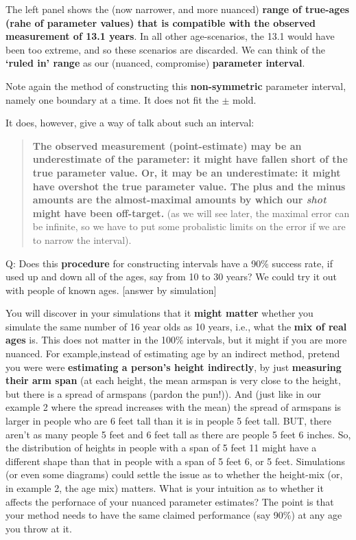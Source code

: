 \documentclass[
]{article}
\begin{document}
The left panel shows the (now narrower, and more nuanced) \textbf{range
of true-ages (rahe of parameter values) that is compatible with the
observed measurement of 13.1 years}. In all other age-scenarios, the
13.1 would have been too extreme, and so these scenarios are discarded.
We can think of the \textbf{`ruled in' range} as our (nuanced,
compromise) \textbf{parameter interval}.

Note again the method of constructing this \textbf{non-symmetric}
parameter interval, namely one boundary at a time. It does not fit the
\(\pm\) mold.

It does, however, give a way of talk about such an interval:

\begin{quote}
\textbf{The observed measurement (point-estimate) may be an
underestimate of the parameter: it might have fallen short of the true
parameter value. Or, it may be an underestimate: it might have overshot
the true parameter value. The plus and the minus amounts are the
almost-maximal amounts by which our \emph{shot} might have been
off-target.} (as we will see later, the maximal error can be infinite,
so we have to put some probalistic limits on the error if we are to
narrow the interval).
\end{quote}

Q: Does this \textbf{procedure} for constructing intervals have a 90\%
success rate, if used up and down all of the ages, say from 10 to 30
years? We could try it out with people of known ages. {[}answer by
simulation{]}

You will discover in your simulations that it \textbf{might matter}
whether you simulate the same number of 16 year olds as 10 years, i.e.,
what the \textbf{mix of real ages} is. This does not matter in the 100\%
intervals, but it might if you are more nuanced. For example,instead of
estimating age by an indirect method, pretend you were were
\textbf{estimating a person's height indirectly}, by just
\textbf{measuring their arm span} (at each height, the mean armspan is
very close to the height, but there is a spread of armspans (pardon the
pun!)). And (just like in our example 2 where the spread increases with
the mean) the spread of armspans is larger in people who are 6 feet tall
than it is in people 5 feet tall. BUT, there aren't as many people 5
feet and 6 feet tall as there are people 5 feet 6 inches. So, the
distribution of heights in people with a span of 5 feet 11 might have a
different shape than that in people with a span of 5 feet 6, or 5 feet.
Simulations (or even some diagrams) could settle the issue as to whether
the height-mix (or, in example 2, the age mix) matters. What is your
intuition as to whether it affects the perfornace of your nuanced
parameter estimates? The point is that your method needs to have the
same claimed performance (say 90\%) at any age you throw at it.
\end{document}
